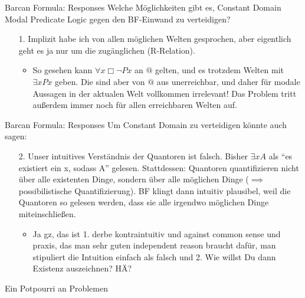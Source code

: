 \documentclass[12pt]{beamer}
\begin{document}
\begin{frame}{Barcan Formula: Responses}
  Welche Möglichkeiten gibt es, Constant Domain Modal Predicate Logic
  gegen den BF-Einwand zu verteidigen?
  \begin{enumerate}[<+->]
  \item[1.] Implizit habe ich von allen möglichen Welten gesprochen,
    aber eigentlich geht es ja nur um die zugänglichen (R-Relation).
    \begin{itemize}[<+->]
    \item So gesehen kann $\forall x \Box \neg Px$ an $@$ gelten, und
      es trotzdem Welten mit $\exists x Px$ geben. Die sind aber von
      $@$ aus unerreichbar, und daher für modale Aussagen in der
      aktualen Welt vollkommen irrelevant! Das Problem tritt außerdem
      immer noch für allen erreichbaren Welten auf.
    \end{itemize}
  \end{enumerate}
\end{frame}
\begin{frame}{Barcan Formula: Responses}
  Um Constant Domain zu verteidigen könnte auch sagen:
  \begin{enumerate}[<+->]
  \item[2.] Unser intuitives Verständnis der Quantoren ist
    falsch. Bisher $\exists x A$ als ``es existiert ein x, sodass A''
    gelesen. Stattdessen: Quantoren quantifizieren nicht über alle
    existenten Dinge, sondern über alle möglichen Dinge ($\implies$
    possibilistische Quantifizierung). BF klingt dann intuitiv
    plausibel, weil die Quantoren so gelesen werden, dass sie alle
    irgendwo möglichen Dinge miteinschließen.
    \begin{itemize}[<+->]
    \item Ja gz, das ist 1. derbe kontraintuitiv und against common
      sense und praxis, das man sehr guten independent reason braucht
      dafür, man stipuliert die Intuition einfach als falsch und
      2. Wie willst Du dann Existenz auszeichnen? HÄ?
    \end{itemize}
  \end{enumerate}
\end{frame}

\begin{frame}
  \Huge Ein Potpourri an Problemen
\end{frame}
\end{document}
